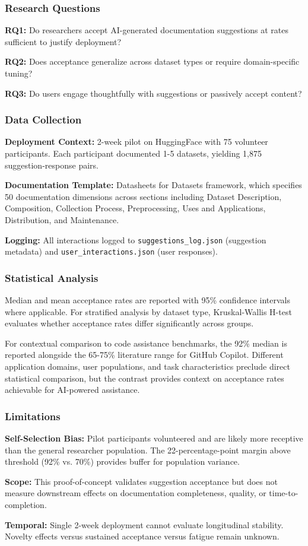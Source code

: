 
\subsubsection{Research Questions}

\textbf{RQ1:} Do researchers accept AI-generated documentation suggestions at rates sufficient to justify deployment?

\textbf{RQ2:} Does acceptance generalize across dataset types or require domain-specific tuning?

\textbf{RQ3:} Do users engage thoughtfully with suggestions or passively accept content?

\subsubsection{Data Collection}

\textbf{Deployment Context:} 2-week pilot on HuggingFace with 75 volunteer participants. Each participant documented 1-5 datasets, yielding 1,875 suggestion-response pairs.

\textbf{Documentation Template:} Datasheets for Datasets framework, which specifies 50 documentation dimensions across sections including Dataset Description, Composition, Collection Process, Preprocessing, Uses and Applications, Distribution, and Maintenance.

\textbf{Logging:} All interactions logged to \texttt{suggestions_log.json} (suggestion metadata) and \texttt{user_interactions.json} (user responses).

\subsubsection{Statistical Analysis}

Median and mean acceptance rates are reported with 95\% confidence intervals where applicable. For stratified analysis by dataset type, Kruskal-Wallis H-test evaluates whether acceptance rates differ significantly across groups.

For contextual comparison to code assistance benchmarks, the 92\% median is reported alongside the 65-75\% literature range for GitHub Copilot. Different application domains, user populations, and task characteristics preclude direct statistical comparison, but the contrast provides context on acceptance rates achievable for AI-powered assistance.

\subsubsection{Limitations}

\textbf{Self-Selection Bias:} Pilot participants volunteered and are likely more receptive than the general researcher population. The 22-percentage-point margin above threshold (92\% vs. 70\%) provides buffer for population variance.

\textbf{Scope:} This proof-of-concept validates suggestion acceptance but does not measure downstream effects on documentation completeness, quality, or time-to-completion.

\textbf{Temporal:} Single 2-week deployment cannot evaluate longitudinal stability. Novelty effects versus sustained acceptance versus fatigue remain unknown.
